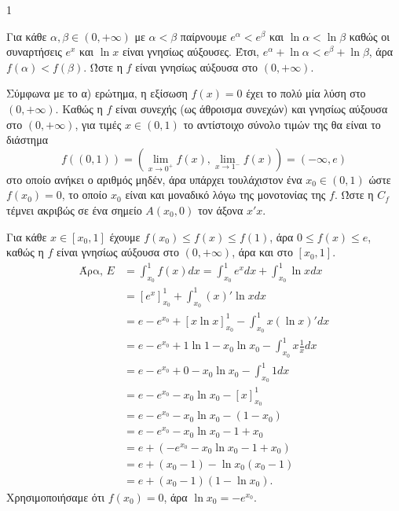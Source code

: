 \begin{ylh}{1}
    \item [Ύλη από εικόνα]
\end{ylh}
\begin{alist}
\item Για κάθε $\alpha, \beta \in (0, +\infty)$ με $\alpha < \beta$ παίρνουμε $e^\alpha < e^\beta$ και $\ln \alpha < \ln \beta$ καθώς οι συναρτήσεις $e^x$ και $\ln x$ είναι γνησίως αύξουσες. Έτσι, $e^\alpha + \ln \alpha < e^\beta + \ln \beta$, άρα $f(\alpha) < f(\beta)$. Ώστε η $f$ είναι γνησίως αύξουσα στο $(0, +\infty)$.
\item Σύμφωνα με το α) ερώτημα, η εξίσωση $f(x) = 0$ έχει το πολύ μία λύση στο $(0, +\infty)$. Καθώς η $f$ είναι συνεχής (ως άθροισμα συνεχών) και γνησίως αύξουσα στο $(0, +\infty)$, για τιμές $x \in (0,1)$ το αντίστοιχο σύνολο τιμών της θα είναι το διάστημα
\[
f((0,1)) = \left(\lim_{x \to 0^+} f(x), \lim_{x \to 1^-} f(x)\right) = (-\infty, e)
\]
στο οποίο ανήκει ο αριθμός μηδέν, άρα υπάρχει τουλάχιστον ένα $x_0 \in (0,1)$ ώστε $f(x_0) = 0$, το οποίο $x_0$ είναι και μοναδικό λόγω της μονοτονίας της $f$.
Ώστε η $C_f$ τέμνει ακριβώς σε ένα σημείο $A(x_0, 0)$ τον άξονα $x'x$.
\item Για κάθε $x \in [x_0, 1]$ έχουμε $f(x_0) \le f(x) \le f(1)$, άρα $0 \le f(x) \le e$, καθώς η $f$ είναι γνησίως αύξουσα στο $(0, +\infty)$, άρα και στο $[x_0, 1]$.
\[
\begin{aligned}
\text{Άρα, } E &= \int_{x_0}^1 f(x)dx = \int_{x_0}^1 e^x dx + \int_{x_0}^1 \ln x dx \\
&= \left[e^x\right]_{x_0}^1 + \int_{x_0}^1 (x)'\ln x dx \\
&= e - e^{x_0} + \left[x\ln x\right]_{x_0}^1 - \int_{x_0}^1 x(\ln x)' dx \\
&= e - e^{x_0} + 1\ln 1 - x_0\ln x_0 - \int_{x_0}^1 x \frac{1}{x} dx \\
&= e - e^{x_0} + 0 - x_0\ln x_0 - \int_{x_0}^1 1 dx \\
&= e - e^{x_0} - x_0\ln x_0 - \left[x\right]_{x_0}^1 \\
&= e - e^{x_0} - x_0\ln x_0 - (1 - x_0) \\
&= e - e^{x_0} - x_0\ln x_0 - 1 + x_0 \\
&= e + (-e^{x_0} - x_0\ln x_0 - 1 + x_0) \\
&= e + (x_0 - 1) - \ln x_0 (x_0 - 1) \\
&= e + (x_0 - 1)(1 - \ln x_0).
\end{aligned}
\]
Χρησιμοποιήσαμε ότι $f(x_0) = 0$, άρα $\ln x_0 = -e^{x_0}$.
\end{alist}